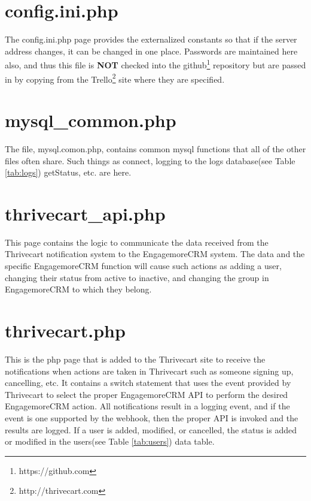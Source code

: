 \documentclass[final,letterpaper,12pt]{article}
\begin{document}
\newpage
\begin{appendices}

\section{config.ini.php}
\noindent The config.ini.php page provides the externalized constants so that if the server address changes, it can be changed in one place.  Passwords are maintained here also, and thus this file is {\bf NOT} checked into the github\footnote{https://github.com} repository but are passed in by copying from the Trello\footnote{http://thrivecart.com} site where they are specified.



\section{mysql\_common.php}
\noindent The file, mysql.comon.php, contains common mysql functions that all of the other files often share.  Such things as connect, logging to the logs database(see Table \ref{tab:logs}) getStatus, etc. are here.



\section{thrivecart\_api.php}
\noindent This page contains the logic to communicate the data received from the Thrivecart notification system to the EngagemoreCRM system.  The data and the specific EngagemoreCRM function will cause such actions as adding a user, changing their status from active to inactive, and changing the group in EngagemoreCRM to which they belong.



\section{thrivecart.php}
\noindent This is the php page that is added to the Thrivecart site to receive the notifications when actions are taken in Thrivecart such as someone signing up, cancelling, etc.  It contains a switch statement that uses the event provided by Thrivecart to select the proper EngagemoreCRM API to perform the desired EngagemoreCRM action.  All notifications result in a logging event, and if the event is one supported by the webhook, then the proper API is invoked and the results are logged.  If a user is added, modified, or cancelled, the status is added or modified in the users(see Table \ref{tab:users}) data table.


\end{appendices}
\end{document}
